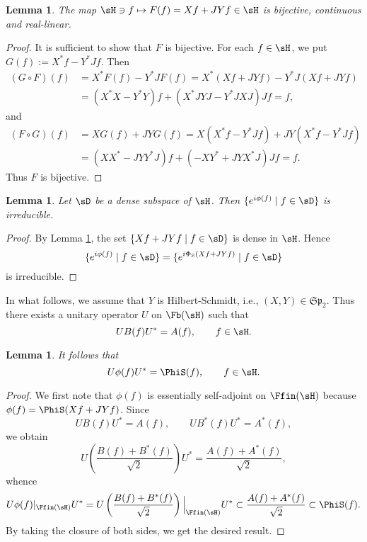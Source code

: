 \documentclass[12pt,draft]{article}
\theoremstyle{plain}
\newtheorem{lem}[theorem]{\bf Lemma}
\numberwithin{equation}{section}
\theoremstyle{remark}
\begin{document}
\begin{lem}\label{bijective}
The map $\sH\ni f\mapsto F(f)=Xf+JYf\in\sH$ is bijective, continuous and real-linear.
\end{lem}

\begin{proof}
It is sufficient to show that $F$ is bijective.
For each $f\in\sH$, we put $G(f):=X^*f-Y^*Jf$.
Then
\begin{align*}
(G\circ F)(f) &= X^*F(f)-Y^*JF(f) = X^*(Xf+JYf)-Y^*J(Xf+JYf)\\
&= (X^*X-Y^*Y)f + (X^*JYJ-Y^*JXJ)Jf=f,
\end{align*}
and
\begin{align*}
(F\circ G)(f) &= XG(f)+JYG(f) = X(X^*f-Y^*Jf)+JY(X^*f-Y^*Jf)\\
&= (XX^*-JYY^*J)f+(-XY^*+JYX^*J)Jf = f.
\end{align*}
Thus $F$ is bijective.
\end{proof}

\begin{lem}\label{irreducible}
Let $\sD $ be a dense subspace of $\sH$.
Then $\{e^{i\phi(f)}\mid f\in\sD \}$ is irreducible.
\end{lem}

\begin{proof}
By Lemma \ref{bijective}, the set $\{Xf+JYf \mid f\in\sD \}$ is dense in $\sH$.
Hence
\[
\{e^{i\phi(f)}\mid f \in \sD \} = \{e^{i\Phi_{\rm S}(Xf+JYf)}\mid f\in \sD \}
\]
is irreducible.
\end{proof}

In what follows, we assume that $Y$ is Hilbert-Schmidt, i.e., $(X,Y)\in\mathfrak{Sp}_2$.
Thus there exists a unitary operator $U$ on $\Fb(\sH)$ such that
\[
 UB(f)U^* = A(f), \qquad f\in\sH.
\] 

\begin{lem}
It follows that
\[
 U\phi(f)U^* = \PhiS(f), \qquad f\in\sH.
\]
\end{lem}

\begin{proof}
We first note that $\phi(f)$ is essentially self-adjoint on $\Ffin(\sH)$ because $\phi(f)=\PhiS(Xf+JYf)$.
Since
\[
 UB(f)U^*=A(f), \qquad UB^*(f)U^*=A^*(f),
\]
we obtain
\[
 U \left( \frac{B(f)+B^*(f)}{\sqrt{2}}\right) U^* = \frac{A(f)+A^*(f)}{\sqrt{2}},
\]
whence
\[
 U\phi(f)|_{\Ffin(\sH)}U^* 
 = U\left(\frac{B(f)+B^*(f)}{\sqrt{2}}\right)\Big|_{\Ffin(\sH)}U^*
   \subset \frac{A(f)+A^*(f)}{\sqrt{2}} \subset \PhiS(f).
\]
By taking the closure of both sides, we get the desired result.
\end{proof}
\end{document}
